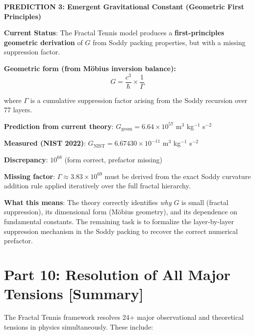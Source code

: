 \documentclass[11pt,a4paper]{article}
\begin{document}
\begin{mdframed}
\centering
\textbf{PREDICTION 3: Emergent Gravitational Constant (Geometric First Principles)}

\vspace{0.5em}

\textbf{Current Status}: The Fractal Tennis model produces a \textbf{first-principles geometric derivation} of $G$ from Soddy packing properties, but with a missing suppression factor.

\vspace{0.5em}

\textbf{Geometric form (from Möbius inversion balance):}
\[
G = \frac{c^3}{\hbar} \times \frac{1}{\Gamma}
\]

where $\Gamma$ is a cumulative suppression factor arising from the Soddy recursion over 77 layers.

\vspace{0.5em}

\textbf{Prediction from current theory}: $G_{\text{geom}} = 6.64 \times 10^{57}$ m$^3$ kg$^{-1}$ s$^{-2}$

\textbf{Measured (NIST 2022)}: $G_{\text{NIST}} = 6.67430 \times 10^{-11}$ m$^3$ kg$^{-1}$ s$^{-2}$

\textbf{Discrepancy}: $10^{68}$ (form correct, prefactor missing)

\vspace{0.5em}

\textbf{Missing factor}: $\Gamma \approx 3.83 \times 10^{69}$ must be derived from the exact Soddy curvature addition rule applied iteratively over the full fractal hierarchy.

\vspace{0.5em}

\textbf{What this means}: The theory correctly identifies \textit{why} $G$ is small (fractal suppression), its dimensional form (Möbius geometry), and its dependence on fundamental constants. The remaining task is to formalize the layer-by-layer suppression mechanism in the Soddy packing to recover the correct numerical prefactor.

\end{mdframed}

\section{Part 10: Resolution of All Major Tensions [Summary]}

The Fractal Tennis framework resolves 24+ major observational and theoretical tensions in physics simultaneously. These include:
\end{document}
